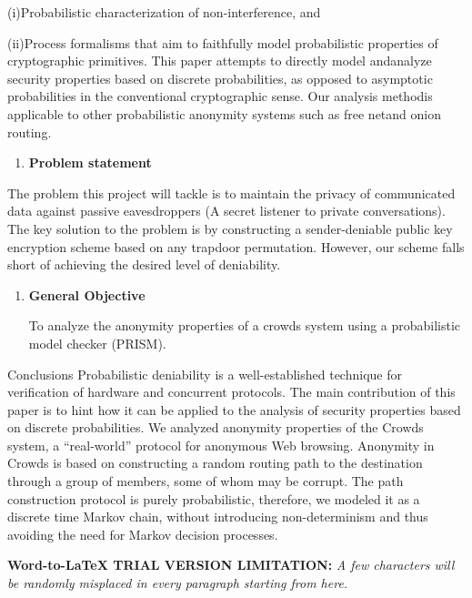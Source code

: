 \documentclass[10pt]{article}
\begin{document}
{\raggedright
(i){\large  }Probabilistic characterization of non-interference, and
}

{\raggedright
(ii){\large  }Process formalisms that aim to faithfully model probabilistic
properties of cryptographic primitives. This paper attempts to directly model
and{\large  }analyze security properties based on discrete probabilities, as
opposed to asymptotic probabilities in the conventional cryptographic sense. Our
analysis method{\large  }is applicable to other probabilistic anonymity systems
such as free net{\large  }and onion routing.
}

\begin{enumerate}
	\item \textbf{{\large Problem statement}}
\end{enumerate}

{\raggedright
{\large The problem this project will tackle is to maintain the privacy of
communicated data against passive eavesdroppers (A secret listener to private
conversations). The key solution to the problem is by constructing a
sender-deniable public key encryption scheme based on any trapdoor permutation.
However, our scheme falls short of achieving the desired level of deniability. }
}
\begin{enumerate}
	\item \textbf{{\large General Objective}}
	{\raggedright
{\large To analyze the anonymity properties of a crowds system using a probabilistic model checker (PRISM). }
}
\end{enumerate}
{\raggedright
{\large Conclusions
Probabilistic deniability is a well-established technique for verification of hardware and concurrent protocols. The main contribution of this paper is to hint how it can be applied to the analysis of security properties based on discrete probabilities. We analyzed anonymity properties of the Crowds system, a “real-world” protocol for anonymous Web browsing. Anonymity in Crowds is based on constructing a random routing path to the destination through a group of members, some of whom may be corrupt. The path construction protocol is purely probabilistic, therefore, we modeled it as a discrete time Markov chain, without introducing non-determinism and thus avoiding the need for Markov decision processes.
}
}
{\large  }
\textbf{Word-to-LaTeX TRIAL VERSION LIMITATION:}\textit{ A few characters will be randomly misplaced in every paragraph starting from here.}
\end{document}
